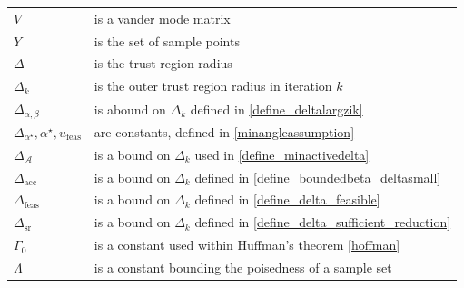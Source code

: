 \documentclass{article}
\theoremstyle{case}
\newcommand{\dacc}{{\Delta_{\text{acc}}}}
\newcommand{\deltalargzik}{{\Delta_{\alpha,\beta}}}
\newcommand{\dfeas}{{\Delta_{\text{feas}}}}
\newcommand{\dk}{\Delta_k}
\newcommand{\dsr}{{\Delta_{\text{sr}}}}
\newcommand{\huff}{{\Gamma_0}}
\newcommand{\minactivegraddelta}{{\Delta_{\mathcal A}}}
\newcommand{\minanglealpha}{{ \alpha^{\star} }}
\newcommand{\minangledelta}{{\Delta_{\alpha^{\star}}}}
\newcommand{\minangleu}{{u_{\textrm{feas}}}}
\begin{document}
\begin{longtable}{| p{} | p{} |}
$V$ & is a vander mode matrix \\ %
$Y$ & is the set of sample points \\ %
$\Delta$ & is the trust region radius \\ %
$\dk$ & is the outer trust region radius in iteration $k$ \\ %
$\deltalargzik $ & is abound on $\dk$ defined in \cref{define_deltalargzik} \\ %
$\minangledelta, \minanglealpha, \minangleu$ & are constants, defined in \cref{minangleassumption} \\ %
$\minactivegraddelta$ & is a bound on $\dk$ used in \cref{define_minactivedelta} \\ %
$\dacc$ & is a bound on $\dk$ defined in \cref{define_boundedbeta_deltasmall} \\ %
$\dfeas $ & is a bound on $\dk$ defined in \cref{define_delta_feasible} \\ %
$\dsr$ & is a bound on $\dk$ defined in \cref{define_delta_sufficient_reduction} \\ %
$\huff$ & is a constant used within Huffman's theorem \cref{hoffman} \\ %
$\Lambda$ & is a constant bounding the poisedness of a sample set \\ %

\end{longtable}
\end{document}
